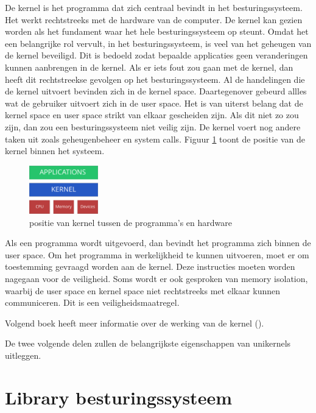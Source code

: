 De kernel is het programma dat zich centraal bevindt in het besturingssysteem. Het werkt rechtstreeks met de hardware van de computer. De kernel kan gezien worden als het fundament waar het hele besturingssysteem op steunt. Omdat het een belangrijke rol vervult, in het besturingssysteem, is veel van het geheugen van de kernel beveiligd. Dit is bedoeld zodat bepaalde applicaties geen veranderingen kunnen aanbrengen in de kernel. Als er iets fout zou gaan met de kernel, dan heeft dit rechtstreekse gevolgen op het besturingssysteem. Al de handelingen die de kernel uitvoert bevinden zich in de kernel space. Daartegenover gebeurd allles wat de gebruiker uitvoert zich in de user space. Het is van uiterst belang dat de kernel space en user space strikt van elkaar gescheiden zijn. Als dit niet zo zou zijn, dan zou een besturingssysteem niet veilig zijn. De kernel voert nog andere taken uit zoals geheugenbeheer en system calls. Figuur \ref{fig:kernel} toont de positie van de kernel binnen het systeem.

\begin{figure}
    \centering
    \includegraphics[width=3cm]{img/kernel}
    \caption{positie van kernel tussen de programma's en hardware}
    \label{fig:kernel}
\end{figure}

Als een programma wordt uitgevoerd, dan bevindt het programma zich binnen de user space. Om het programma in werkelijkheid te kunnen uitvoeren, moet er om toestemming gevraagd worden aan de kernel. Deze instructies moeten worden nagegaan voor de veiligheid. Soms wordt er ook gesproken van memory isolation, waarbij de user space en kernel space niet rechtstreeks met elkaar kunnen communiceren. Dit is een veiligheidsmaatregel.

Volgend boek heeft meer informatie over de werking van de kernel (\cite{bovet_understanding_2005}).

De twee volgende delen zullen de belangrijkste eigenschappen van unikernels uitleggen.

\section{Library besturingssysteem}

